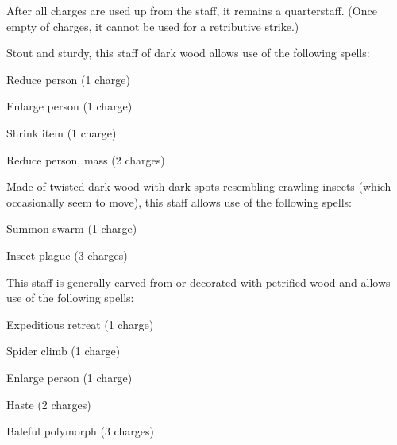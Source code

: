 After all charges are used up from the staff, it remains a  quarterstaff. (Once empty of charges, it cannot be used for a retributive strike.)


 Stout and sturdy, this staff of dark wood allows use of the following spells:
\begin{itemize*}
\item Reduce person (1 charge)
\item Enlarge person (1 charge)
\item Shrink item (1 charge)
\item Reduce person, mass (2 charges)
\end{itemize*}


 Made of twisted dark wood with dark spots resembling crawling insects (which occasionally seem to move), this staff allows use of the following spells:
\begin{itemize*}
\item Summon swarm (1 charge)
\item Insect plague (3 charges)
\end{itemize*}


 This staff is generally carved from or decorated with petrified wood and allows use of the following spells:
\begin{itemize*}
\item Expeditious retreat (1 charge)
\item Spider climb (1 charge)
\item Enlarge person (1 charge)
\item Haste (2 charges)
\item Baleful polymorph (3 charges)
\end{itemize*}



